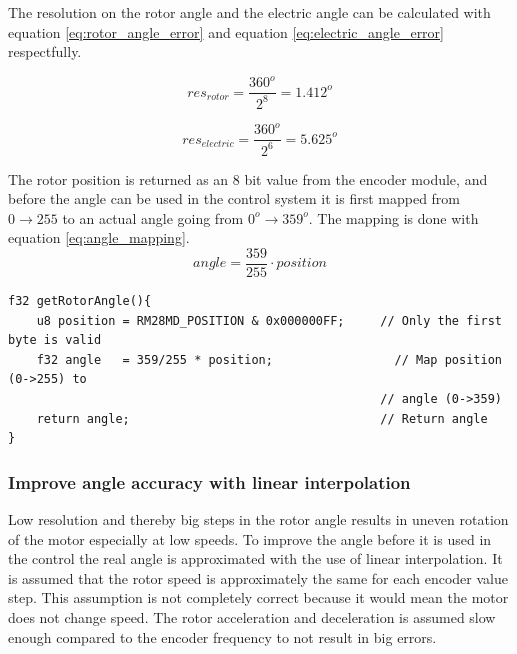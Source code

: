 The resolution on the rotor angle and the electric angle can be calculated with equation \ref{eq:rotor_angle_error} and equation \ref{eq:electric_angle_error} respectfully. 

\begin{equation}
res_{rotor} = \frac{360^o}{2^8} = 1.412^o
\label{eq:rotor_angle_error}
\end{equation}

\begin{equation}
res_{electric} = \frac{360^o}{2^6} = 5.625^o
\label{eq:electric_angle_error}
\end{equation}




The rotor position is returned as an 8 bit value from the encoder module, and before the angle can be used in the control system it is first mapped from $0 \rightarrow 255$ to an actual angle going from $0^o \rightarrow 359^o$. The mapping is done with equation \ref{eq:angle_mapping}.
\begin{equation}
    angle = \frac{359}{255} \cdot position
    \label{eq:angle_mapping}
\end{equation}



\begin{lstlisting}[style=c, caption=Function to read an angle from the encoder. The angle is returned in degrees., label=code:encoder_angle_function]
f32 getRotorAngle(){
    u8 position = RM28MD_POSITION & 0x000000FF;     // Only the first byte is valid
    f32 angle   = 359/255 * position;       	      // Map position (0->255) to 
                                                    // angle (0->359)
    return angle;                                   // Return angle
}
\end{lstlisting}


\subsubsection{Improve angle accuracy with linear interpolation}
Low resolution and thereby big steps in the rotor angle results in uneven rotation of the motor especially at low speeds.
To improve the angle before it is used in the control the real angle is approximated with the use of linear interpolation. It is assumed that the rotor speed is approximately the same for each encoder value step. This assumption is not completely correct because it would mean the motor does not change speed. The rotor acceleration and deceleration is assumed slow enough compared to the encoder frequency to not result in big errors.

